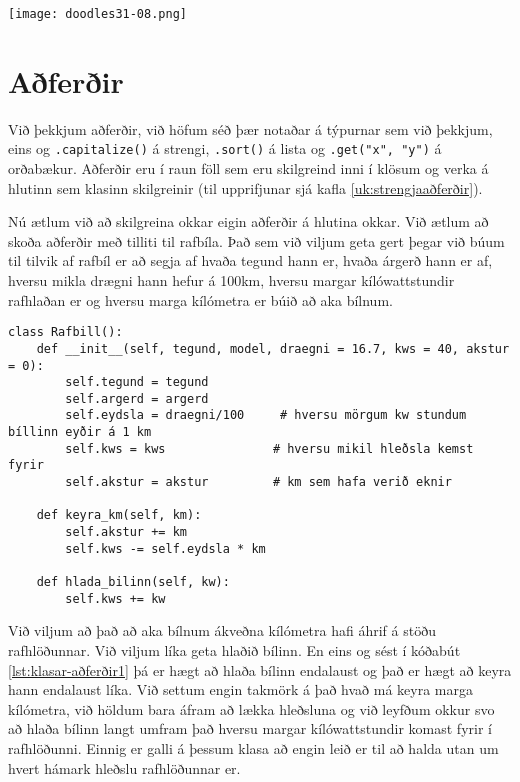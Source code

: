 \phantom{easter egg}
\begin{center}
	\texttt{[image: doodles31-08.png]}
\end{center}

\section{Aðferðir}\label{uk:klasar-aðferðir}
Við þekkjum aðferðir, við höfum séð þær notaðar á týpurnar sem við þekkjum, eins og \texttt{.capitalize()} á strengi, \texttt{.sort()} á lista og \texttt{.get("x", "y")} á orðabækur.
Aðferðir eru í raun föll sem eru skilgreind inni í klösum og verka á hlutinn sem klasinn skilgreinir (til upprifjunar sjá kafla \ref{uk:strengjaaðferðir}).

Nú ætlum við að skilgreina okkar eigin aðferðir á hlutina okkar.
Við ætlum að skoða aðferðir með tilliti til rafbíla.
Það sem við viljum geta gert þegar við búum til tilvik af rafbíl er að segja af hvaða tegund hann er, hvaða árgerð hann er af, hversu mikla drægni hann hefur á 100km, hversu margar kílówattstundir rafhlaðan er og hversu marga kílómetra er búið að aka bílnum.

\begin{lstlisting}[caption=Klasaaðferðir á rafbílaklasa, label=lst:klasar-aðferðir1]
class Rafbill():
	def __init__(self, tegund, model, draegni = 16.7, kws = 40, akstur = 0):
		self.tegund = tegund     
		self.argerd = argerd        
		self.eydsla = draegni/100     # hversu mörgum kw stundum bíllinn eyðir á 1 km
		self.kws = kws               # hversu mikil hleðsla kemst fyrir
		self.akstur = akstur         # km sem hafa verið eknir

	def keyra_km(self, km):
		self.akstur += km
		self.kws -= self.eydsla * km  

	def hlada_bilinn(self, kw):
		self.kws += kw
\end{lstlisting}

Við viljum að það að aka bílnum ákveðna kílómetra hafi áhrif á stöðu rafhlöðunnar.
Við viljum líka geta hlaðið bílinn.
En eins og sést í kóðabút \ref{lst:klasar-aðferðir1} þá er hægt að hlaða bílinn endalaust og það er hægt að keyra hann endalaust líka.
Við settum engin takmörk á það hvað má keyra marga kílómetra, við höldum bara áfram að lækka hleðsluna og við leyfðum okkur svo að hlaða bílinn langt umfram það hversu margar kílówattstundir komast fyrir í rafhlöðunni.
Einnig er galli á þessum klasa að engin leið er til að halda utan um hvert hámark hleðslu rafhlöðunnar er.

